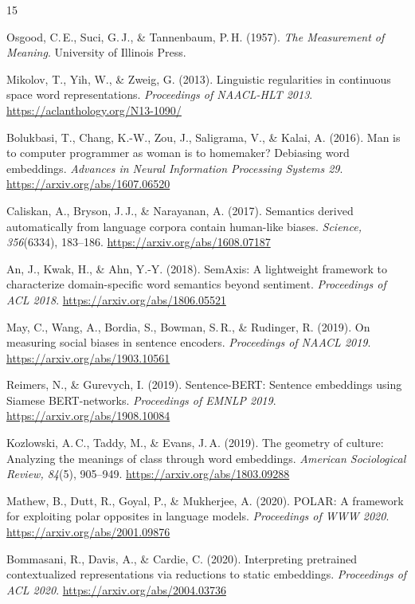 \documentclass[11pt, letterpaper]{article}
\begin{document}
\begin{thebibliography}{15}

  Osgood, C.\,E., Suci, G.\,J., \& Tannenbaum, P.\,H. (1957). \textit{The Measurement of Meaning}. University of Illinois Press.

  Mikolov, T., Yih, W., \& Zweig, G. (2013). Linguistic regularities in continuous space word representations. \textit{Proceedings of NAACL-HLT 2013}. \url{https://aclanthology.org/N13-1090/}

  Bolukbasi, T., Chang, K.-W., Zou, J., Saligrama, V., \& Kalai, A. (2016). Man is to computer programmer as woman is to homemaker? Debiasing word embeddings. \textit{Advances in Neural Information Processing Systems 29}. \url{https://arxiv.org/abs/1607.06520}

  Caliskan, A., Bryson, J.\,J., \& Narayanan, A. (2017). Semantics derived automatically from language corpora contain human-like biases. \textit{Science, 356}(6334), 183--186. \url{https://arxiv.org/abs/1608.07187}

  An, J., Kwak, H., \& Ahn, Y.-Y. (2018). SemAxis: A lightweight framework to characterize domain-specific word semantics beyond sentiment. \textit{Proceedings of ACL 2018}. \url{https://arxiv.org/abs/1806.05521}

  May, C., Wang, A., Bordia, S., Bowman, S.\,R., \& Rudinger, R. (2019). On measuring social biases in sentence encoders. \textit{Proceedings of NAACL 2019}. \url{https://arxiv.org/abs/1903.10561}

  Reimers, N., \& Gurevych, I. (2019). Sentence-BERT: Sentence embeddings using Siamese BERT-networks. \textit{Proceedings of EMNLP 2019}. \url{https://arxiv.org/abs/1908.10084}

   Kozlowski, A.\,C., Taddy, M., \& Evans, J.\,A. (2019). The geometry of culture: Analyzing the meanings of class through word embeddings. \textit{American Sociological Review, 84}(5), 905--949. \url{https://arxiv.org/abs/1803.09288}

  Mathew, B., Dutt, R., Goyal, P., \& Mukherjee, A. (2020). POLAR: A framework for exploiting polar opposites in language models. \textit{Proceedings of WWW 2020}. \url{https://arxiv.org/abs/2001.09876}

  Bommasani, R., Davis, A., \& Cardie, C. (2020). Interpreting pretrained contextualized representations via reductions to static embeddings. \textit{Proceedings of ACL 2020}. \url{https://arxiv.org/abs/2004.03736}


\end{thebibliography}
\end{document}

